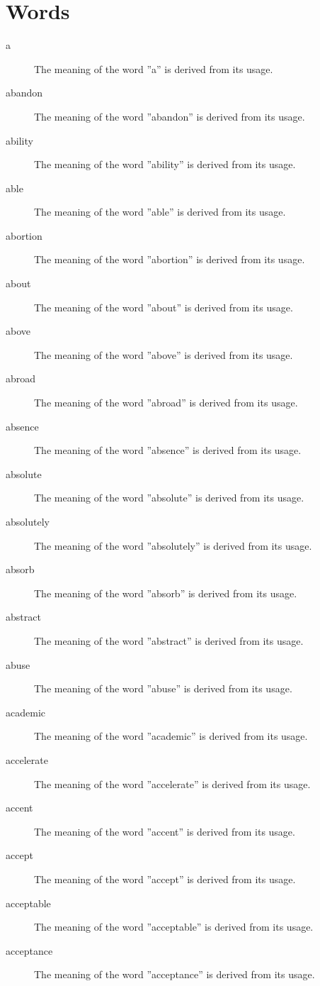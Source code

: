 \documentclass[12pt, letterpaper]{memoir}
\begin{document}
\chapter*{Words}
\renewcommand{\chaptername}{Words}
\begin{description}

\item[a] The meaning of the word ''a'' is derived from its usage.
\item[abandon] The meaning of the word ''abandon'' is derived from its usage.
\item[ability] The meaning of the word ''ability'' is derived from its usage.
\item[able] The meaning of the word ''able'' is derived from its usage.
\item[abortion] The meaning of the word ''abortion'' is derived from its usage.
\item[about] The meaning of the word ''about'' is derived from its usage.
\item[above] The meaning of the word ''above'' is derived from its usage.
\item[abroad] The meaning of the word ''abroad'' is derived from its usage.
\item[absence] The meaning of the word ''absence'' is derived from its usage.
\item[absolute] The meaning of the word ''absolute'' is derived from its usage.
\item[absolutely] The meaning of the word ''absolutely'' is derived from its usage.
\item[absorb] The meaning of the word ''absorb'' is derived from its usage.
\item[abstract] The meaning of the word ''abstract'' is derived from its usage.
\item[abuse] The meaning of the word ''abuse'' is derived from its usage.
\item[academic] The meaning of the word ''academic'' is derived from its usage.
\item[accelerate] The meaning of the word ''accelerate'' is derived from its usage.
\item[accent] The meaning of the word ''accent'' is derived from its usage.
\item[accept] The meaning of the word ''accept'' is derived from its usage.
\item[acceptable] The meaning of the word ''acceptable'' is derived from its usage.
\item[acceptance] The meaning of the word ''acceptance'' is derived from its usage.

\end{description}
\end{document}
